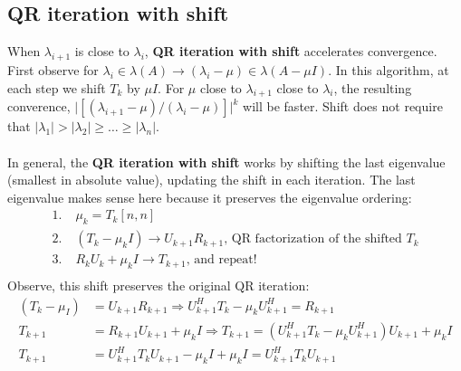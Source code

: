 \documentclass{article}
\newcommand{\abs}[1]{\lvert#1\rvert}
\begin{document}
\subsection{QR iteration with shift}
When $\lambda_{i+1}$ is close to $\lambda_i$, \textbf{QR iteration with shift} accelerates convergence. First observe for $\lambda_i \in \lambda(A) \rightarrow (\lambda_i - \mu) \in \lambda(A - \mu I)$. In this algorithm, at each step we shift $T_k$ by $\mu I$. For $\mu$ close to $\lambda_{i+1}$ close to $\lambda_i$, the resulting converence, $\abs{[(\lambda_{i+1} - \mu) / (\lambda_i - \mu)]}^k$ will be faster. Shift does not require that $\abs{\lambda_1} > \abs{\lambda_2} \geq \dots \geq \abs{\lambda_n}$.\\ \\
In general, the \textbf{QR iteration with shift} works by shifting the last eigenvalue (smallest in absolute value), updating the shift in each iteration. The last eigenvalue makes sense here because it preserves the eigenvalue ordering:
\begin{align*}
    1. \;& \mu_k = T_k[n, n]\\
    2. \;& (T_k - \mu_k I) \longrightarrow U_{k+1}R_{k+1} \textrm{, QR factorization of the shifted } T_k\\
    3. \;& R_kU_k + \mu_k I \longrightarrow T_{k+1} \textrm{, and repeat!}\\
\end{align*}
Observe, this shift preserves the original QR iteration:
\begin{align*}
    (T_k - \mu_ I) &= U_{k+1}R_{k+1} \Longrightarrow U_{k+1}^HT_k - \mu_k U_{k+1}^H = R_{k+1}\\
    T_{k+1} &= R_{k+1}U_{k+1} + \mu_k I \Longrightarrow T_{k+1} = (U_{k+1}^HT_k - \mu_k U_{k+1}^H)U_{k+1} + \mu_k I\\
    T_{k+1} &= U_{k+1}^HT_kU_{k+1} - \mu_k I + \mu_k I = U_{k+1}^HT_kU_{k+1}
\end{align*}
\end{document}
